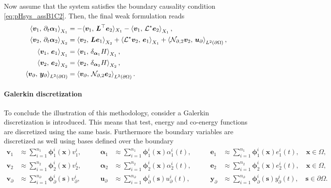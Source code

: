 Now assume that the system satisfies the boundary causality condition \eqref{eq:pHsys_assB1C2}. Then, the final weak formulation reads
\begin{equation}\label{eq:weak_sys_intJ2}
\begin{aligned}
\inner[X_1]{\bm{v}_1}{\partial_t \bm{\alpha}_1} &=   -  \langle{\bm{v}_1}, \,{\bm{L}^\top \bm{e}_2}\rangle_{X_1}  -\inner[X_1]{\bm{v}_1}{\mathcal{L}^*\bm{e}_2}, \\
\inner[X_2]{\bm{v}_2}{\partial_t \bm{\alpha}_2} &=   \inner[X_2]{\bm{v}_2}{\bm{L}\bm{e}_1}  + \inner[X_1]{\mathcal{L}^*\bm{v}_2}{\bm{e}_1} + \inner[L^2(\partial \Omega)]{\mathcal{N}_{\partial, 2} \bm{v}_2}{\bm{u}_{\partial}}, \\
\inner[X_1]{\bm{v}_1}{\bm{e}_1}&= \inner[X_1]{\bm{v}_1}{\delta_{\bm{\alpha}_1} H}, \\
\inner[X_2]{\bm{v}_2}{\bm{e}_2}&= \inner[X_2]{\bm{v}_2}{\delta_{\bm{\alpha}_2} H}, \\
\inner[L^2(\partial \Omega)]{\bm{v}_\partial}{\bm{y}_\partial} &= \inner[L^2(\partial \Omega)]{\bm{v}_\partial}{\mathcal{N}_{\partial, 2}\bm{e}_2}.
\end{aligned}
\end{equation}

\paragraph{Galerkin discretization}
To conclude the illustration of this methodology, consider a Galerkin discretization is introduced. This means that test, energy and co-energy functions are discretized using the same basis. Furthermore the boundary variables are discretized as well using bases defined over the boundary
\begin{equation}\label{eq:approx_vaeb}
\begin{aligned}
\bm{v}_1 &\approx \sum_{i=1}^{n_1} \bm{\phi}_1^i(\bm{x}) v_1^i, \\
\bm{v}_2 &\approx \sum_{i=1}^{n_2} \bm{\phi}_2^i(\bm{x}) v_2^i, \\
\bm{v}_\partial &\approx \sum_{i=1}^{n_\partial} \bm{\phi}_\partial^i(\bm{s}) v_\partial^i,
\end{aligned} \qquad 
\begin{aligned}
\bm{\alpha}_1 &\approx \sum_{i=1}^{n_1} \bm{\phi}_1^i(\bm{x}) \alpha_1^i(t), \\
\bm{\alpha}_2 &\approx \sum_{i=1}^{n_2} \bm{\phi}_2^i(\bm{x}) \alpha_2^i(t), \\
\bm{u}_\partial &\approx \sum_{i=1}^{n_\partial} \bm{\phi}_\partial^i(\bm{s}) u_\partial^i(t), 
\end{aligned} \qquad 
\begin{aligned}
\bm{e}_1 &\approx \sum_{i=1}^{n_1} \bm{\phi}_1^i(\bm{x}) e_1^i(t), \quad \bm{x} \in \Omega, \\
\bm{e}_2 &\approx \sum_{i=1}^{n_2} \bm{\phi}_2^i(\bm{x}) e_2^i(t), \quad \bm{x} \in \Omega,\\
\bm{y}_\partial &\approx \sum_{i=1}^{n_\partial} \bm{\phi}_\partial^i(\bm{s}) y_\partial^i(t), \quad \bm{s} \in \partial\Omega.
\end{aligned}
\end{equation}

